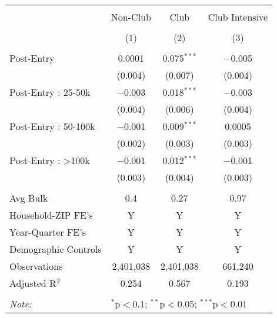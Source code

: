 
\begin{table}[!htbp] \centering 
  \caption{} 
  \label{} 
\begin{tabular}{@{\extracolsep{5pt}}lccc} 
\\[-1.8ex]\hline 
\hline \\[-1.8ex] 
 & Non-Club & Club & Club Intensive \\ 
\\[-1.8ex] & (1) & (2) & (3)\\ 
\hline \\[-1.8ex] 
 Post-Entry & 0.0001 & 0.075$^{***}$ & $-$0.005 \\ 
  & (0.004) & (0.007) & (0.004) \\ 
  Post-Entry : 25-50k & $-$0.003 & 0.018$^{***}$ & $-$0.003 \\ 
  & (0.004) & (0.006) & (0.004) \\ 
  Post-Entry : 50-100k & $-$0.001 & 0.009$^{***}$ & 0.0005 \\ 
  & (0.002) & (0.003) & (0.003) \\ 
  Post-Entry : >100k & $-$0.001 & 0.012$^{***}$ & $-$0.001 \\ 
  & (0.003) & (0.004) & (0.003) \\ 
 \hline \\[-1.8ex] 
Avg Bulk & 0.4 & 0.27 & 0.97 \\ 
Household-ZIP FE's & Y & Y & Y \\ 
Year-Quarter FE's & Y & Y & Y \\ 
Demographic Controls & Y & Y & Y \\ 
Observations & 2,401,038 & 2,401,038 & 661,240 \\ 
Adjusted R$^{2}$ & 0.254 & 0.567 & 0.193 \\ 
\hline 
\hline \\[-1.8ex] 
\textit{Note:}  & \multicolumn{3}{l}{$^{*}$p$<$0.1; $^{**}$p$<$0.05; $^{***}$p$<$0.01} \\ 
\end{tabular} 
\end{table} 
